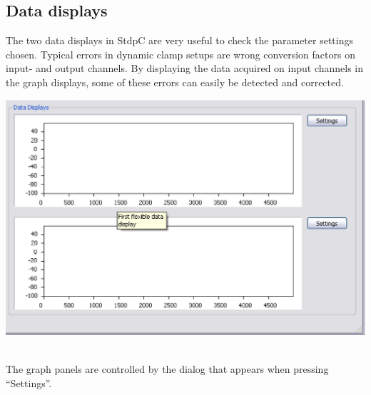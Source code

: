 \documentclass{article}
\begin{document}
\subsection{Data displays}
The two data displays in StdpC are very useful to check the parameter
settings chosen. Typical errors in dynamic clamp setups are wrong
conversion factors on input- and output channels. By displaying the
data acquired on input channels in the graph displays, some of these
errors can easily be detected and corrected. \\[0.2cm]
\parbox{\textwidth}{
  \includegraphics[scale=0.6]{graphBlock}
} \\[0.2cm]
The graph panels are controlled by the dialog that appears when
pressing ``Settings''. \\
\end{document}

